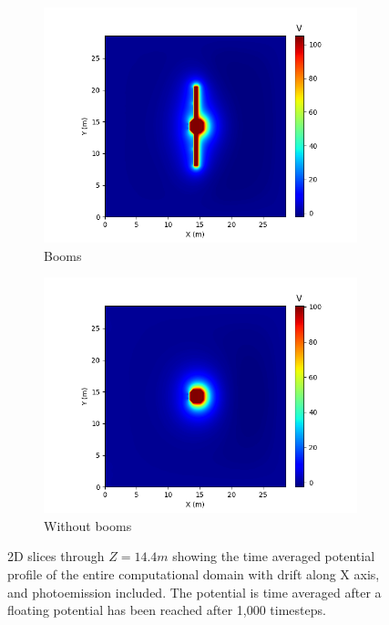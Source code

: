 \begin{figure}[H]
  \begin{subfigure}[b]{0.6\textwidth}
    \includegraphics[width=\textwidth]{figures/MMO/posX/WB/P_posX_WB.png}
    \caption{Booms}
    \label{fig:P_posX_WB}
  \end{subfigure}
  \begin{subfigure}[b]{0.6\textwidth}
    \includegraphics[width=\textwidth]{figures/MMO/posX/NB/P_posX_NB.png}
    \caption{Without booms}
    \label{fig:P_posX_NB}
  \end{subfigure}
  \caption{2D slices through $Z = 14.4 m$ showing the time averaged potential profile of the entire computational domain with drift along X axis, and photoemission included. The potential is time averaged after a floating potential has been reached after 1,000 timesteps.}
  \label{fig:Pot_posX}
\end{figure}

